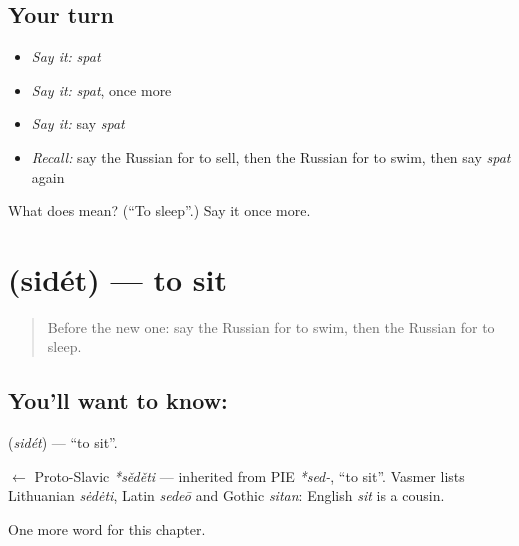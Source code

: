 \subsection*{Your turn}
\begin{itemize}
\raggedright
  \item \emph{Say it:} \emph{spat}
  \item \emph{Say it:} \emph{spat}, once more
  \item \emph{Say it:} say \emph{spat}
  \item \emph{Recall:} say the Russian for to sell, then the Russian for to swim, then say \emph{spat} again
\end{itemize}

\begin{tcolorbox}[breakable,colback=teal!4,colframe=teal!35!black,title={Before you move on}]
What does  mean? (\textquotedblleft{}To sleep\textquotedblright{}.) Say it once more.
\end{tcolorbox}
\section[\texorpdfstring{\ru{сидеть} (sidét)}{сидеть (sidét)}]{ (sidét) — to sit}

\label{lesson:RU-C40-sidet}



\begin{quote}
Before the new one: say the Russian for to swim, then the Russian for to sleep.
\end{quote}

\subsection*{You'll want to know: }
\textbf{} (\emph{sidét}) — \textquotedblleft{}to sit\textquotedblright{}.

\begin{cousinweb}
\textbf{} $\leftarrow$ Proto-Slavic \emph{*sěděti} — inherited from PIE \emph{*sed-}, \textquotedblleft{}to sit\textquotedblright{}. Vasmer lists Lithuanian \emph{sėdėti}, Latin \emph{sedeō} and Gothic \emph{sitan}: English \emph{sit} is a cousin.
\end{cousinweb}

\begin{grammarlens}[title={What you've built}]
One more word for this chapter.
\end{grammarlens}


